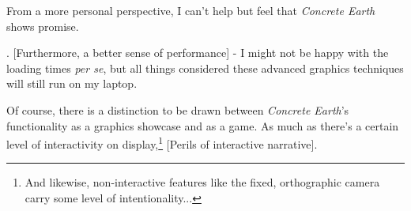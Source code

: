 \documentclass[a4paper, 11pt]{article}
\begin{document}
\begin{flushleft}
From a more personal perspective, I can't help but feel that \textit{Concrete Earth} shows promise.

\vspace{5pt}. [Furthermore, a better sense of performance] - I might not be happy with the loading times \textit{per se}, but all things considered these advanced graphics techniques will still run on my laptop.

\vspace{5pt}\noindent
Of course, there is a distinction to be drawn between \textit{Concrete Earth}'s functionality as a graphics showcase and as a game. As much as there's a certain level of interactivity on display,\footnote{And likewise, non-interactive features like the fixed, orthographic camera carry some level of intentionality...} [Perils of interactive narrative].

\vspace{5pt}


\vspace{5pt}

\vspace{5pt}

\vspace{5pt}



\end{flushleft}
\end{document}
